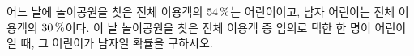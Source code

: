 어느 날에 놀이공원을 찾은 전체 이용객의 $54\mkern3mu \%$는 어린이이고, 남자 어린이는 전체 이용객의 $30\mkern3mu \%$이다. 이 날 놀이공원을 찾은 전체 이용객 중 임의로 택한 한 명이 어린이일 때, 그 어린이가 남자일 확률을 구하시오.
